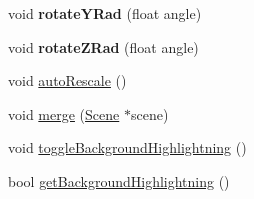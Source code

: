 \begin{DoxyCompactItemize}
\item 
\hypertarget{classScene_a7b1752ca9b485c97990c094cdbdfd5b7}{
void {\bfseries rotateYRad} (float angle)}
\label{classScene_a7b1752ca9b485c97990c094cdbdfd5b7}

\item 
\hypertarget{classScene_a1881e9dfcfeb572ec91c24ead09bbf76}{
void {\bfseries rotateZRad} (float angle)}
\label{classScene_a1881e9dfcfeb572ec91c24ead09bbf76}

\item 
void \hyperlink{classScene_a43cd7232f4c439745bb6bd09bfe723a0}{autoRescale} ()
\item 
void \hyperlink{classScene_ae7ce397f040f9f0d7f2b65bb3b613aad}{merge} (\hyperlink{classScene}{Scene} $\ast$scene)
\item 
void \hyperlink{classScene_a52ce62bd6896ec02c61e187303887ee0}{toggleBackgroundHighlightning} ()
\item 
bool \hyperlink{classScene_abd47005abd1021b8170ac38ad8ee2a3c}{getBackgroundHighlightning} ()
\end{DoxyCompactItemize}

